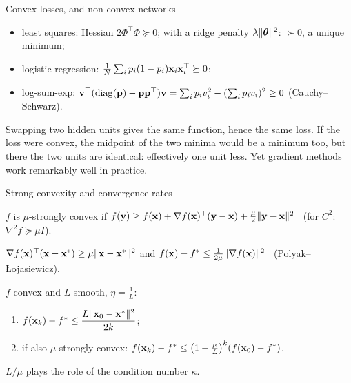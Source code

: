 \documentclass[aspectratio=1610,11pt]{beamer}
\begin{document}
\begin{frame}{Convex losses, and non-convex networks}
    \begin{example}
        \small
        \begin{itemize}
            \item least squares: Hessian $2\Phi^\top\Phi \succeq 0$; with a ridge penalty $\lambda\lVert \boldsymbol{\theta} \rVert^2$: $\succ 0$, a unique minimum;
            \item logistic regression: $\frac{1}{N}\sum_ip_i(1 - p_i)\mathbf{x}_i\mathbf{x}_i^\top \succeq 0$;
            \item log-sum-exp: $\mathbf{v}^\top(\operatorname{diag}(\mathbf{p}) - \mathbf{p}\mathbf{p}^\top)\mathbf{v} = \sum_ip_iv_i^2 - (\sum_ip_iv_i)^2 \geq 0$ (Cauchy--Schwarz).
        \end{itemize}
    \end{example}
    \begin{remark}
        \small Swapping two hidden units gives the same function, hence the same loss. If the loss were convex, the midpoint of the two minima would be a minimum too, but there the two units are identical: effectively one unit less. Yet gradient methods work remarkably well in practice.
    \end{remark}
\end{frame}

\begin{frame}{Strong convexity and convergence rates}
    \begin{definition}
        \small $f$ is $\mu$-strongly convex if $f(\mathbf{y}) \geq f(\mathbf{x}) + \nabla f(\mathbf{x})^\top(\mathbf{y} - \mathbf{x}) + \frac{\mu}{2}\lVert \mathbf{y} - \mathbf{x} \rVert^2$ \ (for $C^2$: $\nabla^2 f \succeq \mu I$).
    \end{definition}
    \begin{lemma}[][lem:pl]
        \small $\nabla f(\mathbf{x})^\top(\mathbf{x} - \mathbf{x}^*) \geq \mu\lVert \mathbf{x} - \mathbf{x}^* \rVert^2$ \quad and \quad $f(\mathbf{x}) - f^* \leq \frac{1}{2\mu}\lVert \nabla f(\mathbf{x}) \rVert^2$ \ (Polyak--{\L}ojasiewicz).
    \end{lemma}
    \begin{theorem}
        \small $f$ convex and $L$-smooth, $\eta = \frac{1}{L}$:
        \begin{enumerate}
            \item $f(\mathbf{x}_k) - f^* \leq \dfrac{L\lVert \mathbf{x}_0 - \mathbf{x}^* \rVert^2}{2k}$;
            \item if also $\mu$-strongly convex: $f(\mathbf{x}_k) - f^* \leq \big(1 - \frac{\mu}{L}\big)^k(f(\mathbf{x}_0) - f^*)$.
        \end{enumerate}
    \end{theorem}
    \small $L/\mu$ plays the role of the condition number $\kappa$.
\end{frame}
\end{document}
